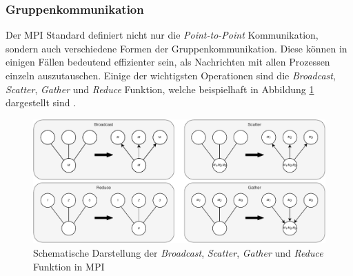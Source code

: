 \subsubsection{Gruppenkommunikation}
Der \ac{MPI} Standard definiert nicht nur die \emph{Point-to-Point} Kommunikation, sondern auch verschiedene Formen der Gruppenkommunikation. Diese können in einigen Fällen bedeutend effizienter sein, als Nachrichten mit allen Prozessen einzeln auszutauschen. Einige der wichtigsten Operationen sind die \emph{Broadcast}, \emph{Scatter}, \emph{Gather} und \emph{Reduce} Funktion, welche beispielhaft in Abbildung \ref{fig:mpi_group_communication} dargestellt sind \cite{dongarra1995introduction}.
\begin{figure}[!h]
	\centering
	\includegraphics[width=1\textwidth]{./img/mpi_group_communication.pdf} 
	\caption{Schematische Darstellung der \emph{Broadcast}, \emph{Scatter}, \emph{Gather} und \emph{Reduce} Funktion in MPI}
	\label{fig:mpi_group_communication}
\end{figure}
\\ \noindent
